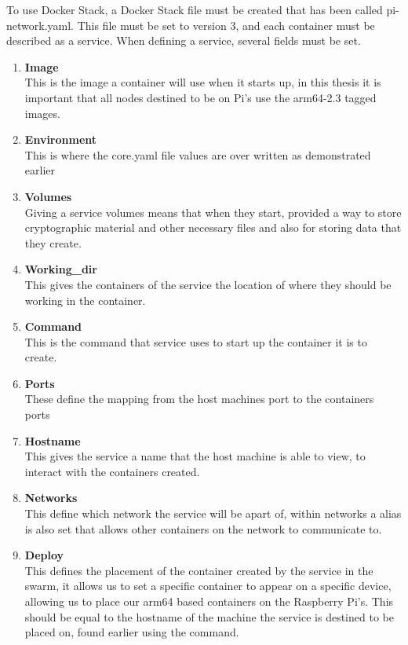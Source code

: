 To use Docker Stack, a Docker Stack file must be created that has been called pi-network.yaml.
This file must be set to version 3, and each container must be described as a service. When defining a service, several fields must be set.
\begin{enumerate}
    \itemsep0em
    \item \textbf{Image} \\
        This is the image a container will use when it starts up, in this thesis it is important that all nodes destined to be on Pi's use the arm64-2.3 tagged images.
    \item \textbf{Environment} \\
        This is where the core.yaml file values are over written as demonstrated earlier
    \item \textbf{Volumes} \\
        Giving a service volumes means that when they start, provided a way to store cryptographic material and other necessary files and also for storing data that they create.
    \item \textbf{Working\_dir} \\
        This gives the containers of the service the location of where they should be working in the container.
    \item \textbf{Command} \\
        This is the command that service uses to start up the container it is to create.
    \item \textbf{Ports} \\ 
        These define the mapping from the host machines port to the containers ports
    \item \textbf{Hostname} \\
        This gives the service a name that the host machine is able to view, to interact with the containers created.
    \item \textbf{Networks} \\ 
        This define which network the service will be apart of, within networks a alias is also set that allows other containers on the network to communicate to.
    \item \textbf{Deploy} \\ 
        This defines the placement of the container created by the service in the swarm, it allows us to set a specific container to appear on a specific device, allowing us to place our arm64 based containers on the Raspberry Pi's. This should be equal to the hostname of the machine the service is destined to be placed on, found earlier using the  command.
\end{enumerate}

